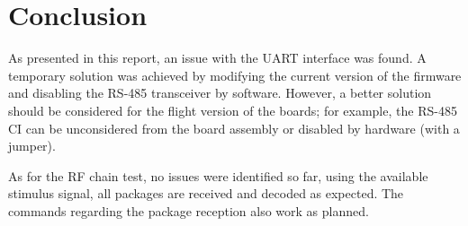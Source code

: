 \section{Conclusion}

As presented in this report, an issue with the UART interface was found. A temporary solution was achieved by modifying the current version of the firmware and disabling the RS-485 transceiver by software. However, a better solution should be considered for the flight version of the boards; for example, the RS-485 CI can be unconsidered from the board assembly or disabled by hardware (with a jumper).

As for the RF chain test, no issues were identified so far, using the available stimulus signal, all packages are received and decoded as expected. The commands regarding the package reception also work as planned.

